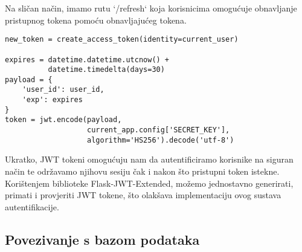 \documentclass[times, utf8, zavrsni]{fer}
\begin{document}
\newpage
Na sličan način, imamo rutu `/refresh` koja korisnicima omogućuje obnavljanje pristupnog tokena pomoću obnavljajućeg tokena.
\begin{verbatim}
new_token = create_access_token(identity=current_user)

expires = datetime.datetime.utcnow() + 
          datetime.timedelta(days=30)
payload = {
    'user_id': user_id,
    'exp': expires
}
token = jwt.encode(payload, 
                   current_app.config['SECRET_KEY'],
                   algorithm='HS256').decode('utf-8')

\end{verbatim}
Ukratko, JWT tokeni omogućuju nam da autentificiramo korisnike na siguran način te održavamo njihovu sesiju čak i nakon što pristupni token istekne. Korištenjem biblioteke Flask-JWT-Extended, možemo jednostavno generirati, primati i provjeriti JWT tokene, što olakšava implementaciju ovog sustava autentifikacije.


\subsection{Povezivanje s bazom podataka}
\end{document}
